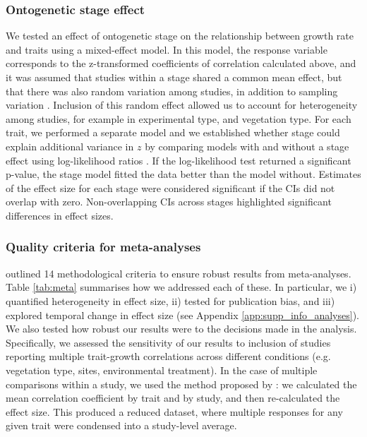\documentclass[a4paper,11pt]{article}
\begin{document}
\subsubsection*{Ontogenetic stage effect}\label{stage-effect}

We tested an effect of ontogenetic stage on the relationship between growth rate and traits using a mixed-effect model. In this model, the response variable corresponds to the z-transformed coefficients of correlation calculated above, and it was assumed that studies within a stage shared a common mean effect, but that there was also random variation among studies, in addition to sampling variation \citep{Zuur:2009cfa}. Inclusion of this random effect allowed us to account for heterogeneity among studies, for example in experimental type, and vegetation type. For each trait, we performed a separate model and we established whether stage could explain additional variance in $z$ by comparing models with and without a stage effect using log-likelihood ratios \citep{Zuur:2009cfa}. If the log-likelihood test returned a significant p-value, the stage model fitted the data better than the model without. Estimates of the effect size for each stage were considered significant if the CIs did not overlap with zero. Non-overlapping CIs across stages highlighted significant differences in effect sizes.

\subsubsection*{Quality criteria for meta-analyses}

\citet{Koricheva:2014ku} outlined 14 methodological criteria to ensure robust results from meta-analyses. Table \ref{tab:meta} summarises how we addressed each of these. In particular, we i) quantified heterogeneity in effect size, ii) tested for publication bias, and iii) explored temporal change in effect size (see Appendix \ref{app:supp_info_analyses}).
We also tested how robust our results were to the decisions made in the analysis. Specifically, we assessed the sensitivity of our results to inclusion of studies reporting multiple trait-growth correlations across different conditions (e.g. vegetation type, sites, environmental treatment). In the case of multiple comparisons within a study, we used the method proposed by \citet{Borenstein:2009um}: we calculated the mean correlation coefficient by trait and by study, and then re-calculated the effect size. This produced a reduced dataset, where multiple responses for any given trait were condensed into a study-level average.
\end{document}
